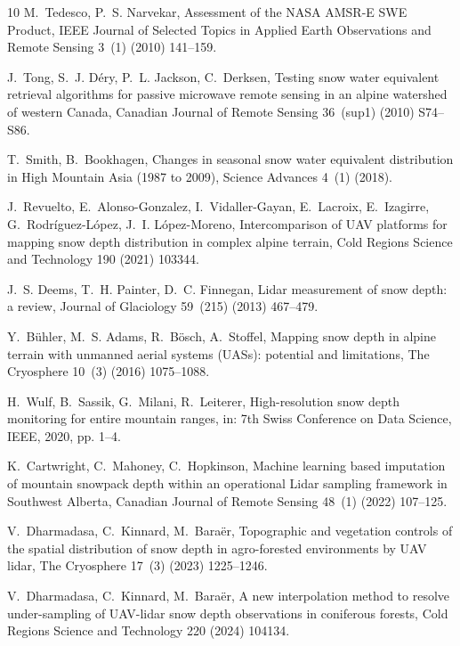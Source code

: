 \documentclass[preprint,12pt]{elsarticle}
\begin{document}
\begin{thebibliography}{10}
M.~Tedesco, P.~S. Narvekar, {Assessment of the NASA AMSR-E SWE Product}, IEEE Journal of Selected Topics in Applied Earth Observations and Remote Sensing 3~(1) (2010) 141–159.

J.~Tong, S.~J. Déry, P.~L. Jackson, C.~Derksen, {Testing snow water equivalent retrieval algorithms for passive microwave remote sensing in an alpine watershed of western Canada}, Canadian Journal of Remote Sensing 36~(sup1) (2010) S74–S86.

T.~Smith, B.~Bookhagen, {Changes in seasonal snow water equivalent distribution in High Mountain Asia (1987 to 2009)}, Science Advances 4~(1) (2018).

J.~Revuelto, E.~Alonso-Gonzalez, I.~Vidaller-Gayan, E.~Lacroix, E.~Izagirre, G.~Rodríguez-López, J.~I. López-Moreno, {Intercomparison of UAV platforms for mapping snow depth distribution in complex alpine terrain}, Cold Regions Science and Technology 190 (2021) 103344.

J.~S. Deems, T.~H. Painter, D.~C. Finnegan, Lidar measurement of snow depth: a review, Journal of Glaciology 59~(215) (2013) 467--479.

Y.~Bühler, M.~S. Adams, R.~Bösch, A.~Stoffel, {Mapping snow depth in alpine terrain with unmanned aerial systems (UASs): potential and limitations}, The Cryosphere 10~(3) (2016) 1075--1088.

H.~Wulf, B.~Sassik, G.~Milani, R.~Leiterer, High-resolution snow depth monitoring for entire mountain ranges, in: 7th Swiss Conference on Data Science, IEEE, 2020, pp. 1--4.

K.~Cartwright, C.~Mahoney, C.~Hopkinson, {Machine learning based imputation of mountain snowpack depth within an operational Lidar sampling framework in Southwest Alberta}, Canadian Journal of Remote Sensing 48~(1) (2022) 107--125.

V.~Dharmadasa, C.~Kinnard, M.~Bara\"er, {Topographic and vegetation controls of the spatial distribution of snow depth in agro-forested environments by UAV lidar}, The Cryosphere 17~(3) (2023) 1225--1246.

V.~Dharmadasa, C.~Kinnard, M.~Bara{\"e}r, {A new interpolation method to resolve under-sampling of UAV-lidar snow depth observations in coniferous forests}, Cold Regions Science and Technology 220 (2024) 104134.


\end{thebibliography}
\end{document}
